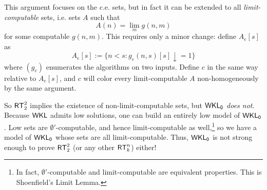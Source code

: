 \documentclass{amsart}
\begin{document}
	This argument focuses on the c.e. sets, but in fact it can be extended to all \textit{limit-computable} sets, i.e. sets $A$ such that
	$$
	A(n) = \lim_m g(n,m)
	$$
	for some computable $g(n,m)$. This requires only a minor change: define $A_e[s]$ as
	$$
	A_e[s] := \{n<s : g_e(n,s)[s]\downarrow = 1\}
	$$
	where $(g_e)$ enumerates the algorithms on two inputs. Define $c$ in the same way relative to $A_e[s]$, and $c$ will color every limit-computable $A$ non-homogeneously by the same argument.
	
	So $\operatorname{\sf{RT}}^2_2$ implies the existence of non-limit-computable sets, but $\operatorname{\sf{WKL_0}}$ \textit{does not}. Because $\sf{WKL}$ admits low solutions, one can build an entirely low model of $\operatorname{\sf{WKL_0}}$. Low sets are $\emptyset'$-computable, and hence limit-computable as well,\footnote{In fact, $\emptyset'$-computable and limit-computable are equivalent properties. This is Shoenfield's Limit Lemma.} so we have a model of $\operatorname{\sf{WKL_0}}$ whose sets are all limit-computable. Thus, $\operatorname{\sf{WKL_0}}$ is not strong enough to prove $\operatorname{\sf{RT}}^2_2$ (or any other $\operatorname{\sf{RT}}^n_k$) either!
	
	
	
	
	
\end{document}
